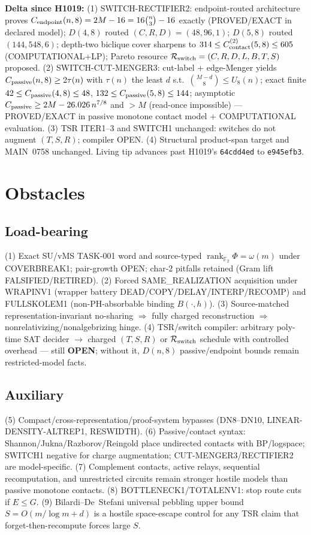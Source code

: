 \documentclass[11pt]{article}
\begin{document}
\textbf{Delta since H1019:}
(1) SWITCH-RECTIFIER2: endpoint-routed architecture proves
$C_{\rm endpoint}(n,8)=2M-16=16\binom n3-16$ exactly (PROVED/EXACT in declared model);
$D(4,8)$ routed $(C,R,D)=(48,96,1)$; $D(5,8)$ routed $(144,548,6)$;
depth-two biclique cover sharpens to $314\le C^{(2)}_{\rm contact}(5,8)\le605$ (COMPUTATIONAL+LP);
Pareto resource $\mathcal R_{\rm switch}=(C,R,D,L,B,T,S)$ proposed.
(2) SWITCH-CUT-MENGER3: cut-label + edge-Menger yields
$C_{\rm passive}(n,8)\ge 2\tau(n)$ with $\tau(n)$ the least $d$ s.t.\ $\binom{M-d}{8}\le U_8(n)$;
exact finite $42\le C_{\rm passive}(4,8)\le48$, $132\le C_{\rm passive}(5,8)\le144$;
asymptotic $C_{\rm passive}\ge 2M-26.026\,n^{7/8}$ and $>M$ (read-once impossible) ---
PROVED/EXACT in passive monotone contact model + COMPUTATIONAL evaluation.
(3) TSR ITER1--3 and SWITCH1 unchanged: switches do not augment $(T,S,R)$; compiler OPEN.
(4) Structural product-span target and MAIN~0758 unchanged. Living tip advances past
H1019's \texttt{64cdd4ed} to \texttt{e945efb3}.

\section*{Obstacles}
\subsection*{Load-bearing}
(1) Exact SU/vMS TASK-001 word and source-typed
$\operatorname{rank}_{\mathbb F_2}\Phi=\omega(m)$ under COVERBREAK1; pair-growth OPEN;
char-$2$ pitfalls retained (Gram lift FALSIFIED/RETIRED).
(2) Forced SAME\_REALIZATION acquisition under WRAPINV1 (wrapper battery DEAD/COPY/DELAY/INTERP/RECOMP)
and FULLSKOLEM1 (non-PH-absorbable binding $B(\cdot,h)$).
(3) Source-matched representation-invariant no-sharing $\Rightarrow$ fully charged reconstruction
$\Rightarrow$ nonrelativizing/nonalgebrizing hinge.
(4) TSR/switch compiler: arbitrary poly-time SAT decider $\to$ charged $(T,S,R)$ or
$\mathcal R_{\rm switch}$ schedule with controlled overhead --- still \textbf{OPEN};
without it, $D(n,8)$ passive/endpoint bounds remain restricted-model facts.

\subsection*{Auxiliary}
(5) Compact/cross-representation/proof-system bypasses (DN8--DN10, LINEAR-DENSITY-ALTREP1, RESWIDTH).
(6) Passive/contact syntax: Shannon/Jukna/Razborov/Reingold place undirected contacts with BP/logspace;
SWITCH1 negative for charge augmentation; CUT-MENGER3/RECTIFIER2 are model-specific.
(7) Complement contacts, active relays, sequential recomputation, and unrestricted circuits remain
stronger hostile models than passive monotone contacts.
(8) BOTTLENECK1/TOTALENV1: stop route cuts if $E\le G$.
(9) Bilardi--De~Stefani universal pebbling upper bound $S=O(m/\log m+d)$ is a hostile
space-escape control for any TSR claim that forget-then-recompute forces large $S$.
\end{document}
